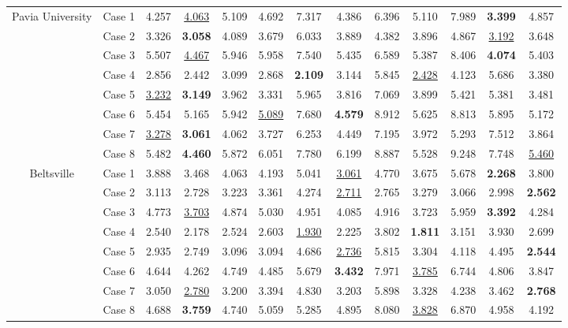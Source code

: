 \begin{table*}[t]
\begin{center}
{\begin{tabular}{cc ccccccccccc}
				\multirow{8}{*}{Pavia University} 
				& Case 1 & 
				4.257 & \underline{4.063} & 5.109 & 4.692 & 7.317 & 4.386 & 6.396 & 5.110 & 7.989 & \textbf{3.399} & 4.857 \\ 
				& Case 2 & 
				3.326 & \textbf{3.058} & 4.089 & 3.679 & 6.033 & 3.889 & 4.382 & 3.896 & 4.867 & \underline{3.192} & 3.648 \\ 
				& Case 3 & 
				5.507 & \underline{4.467} & 5.946 & 5.958 & 7.540 & 5.435 & 6.589 & 5.387 & 8.406 & \textbf{4.074} & 5.403 \\ 
				& Case 4 & 
				2.856 & 2.442 & 3.099 & 2.868 & \textbf{2.109} & 3.144 & 5.845 & \underline{2.428} & 4.123 & 5.686 & 3.380 \\ 
				& Case 5 & 
				\underline{3.232} & \textbf{3.149} & 3.962 & 3.331 & 5.965 & 3.816 & 7.069 & 3.899 & 5.421 & 5.381 & 3.481 \\ 
				& Case 6 & 
				5.454 & 5.165 & 5.942 & \underline{5.089} & 7.680 & \textbf{4.579} & 8.912 & 5.625 & 8.813 & 5.895 & 5.172 \\ 
				& Case 7 & 
				\underline{3.278} & \textbf{3.061} & 4.062 & 3.727 & 6.253 & 4.449 & 7.195 & 3.972 & 5.293 & 7.512 & 3.864 \\ 
				& Case 8 & 
				5.482 & \textbf{4.460} & 5.872 & 6.051 & 7.780 & 6.199 & 8.887 & 5.528 & 9.248 & 7.748 & \underline{5.460} \\ 
				
				\cmidrule(lr){1-13} 
				
				\multirow{8}{*}{Beltsville} 
				& Case 1 & 
				3.888 & 3.468 & 4.063 & 4.193 & 5.041 & \underline{3.061} & 4.770 & 3.675 & 5.678 & \textbf{2.268} & 3.800 \\ 
				& Case 2 & 
				3.113 & 2.728 & 3.223 & 3.361 & 4.274 & \underline{2.711} & 2.765 & 3.279 & 3.066 & 2.998 & \textbf{2.562} \\ 
				& Case 3 & 
				4.773 & \underline{3.703} & 4.874 & 5.030 & 4.951 & 4.085 & 4.916 & 3.723 & 5.959 & \textbf{3.392} & 4.284 \\ 
				& Case 4 & 
				2.540 & 2.178 & 2.524 & 2.603 & \underline{1.930} & 2.225 & 3.802 & \textbf{1.811} & 3.151 & 3.930 & 2.699 \\ 
				& Case 5 & 
				2.935 & 2.749 & 3.096 & 3.094 & 4.686 & \underline{2.736} & 5.815 & 3.304 & 4.118 & 4.495 & \textbf{2.544} \\ 
				& Case 6 & 
				4.644 & 4.262 & 4.749 & 4.485 & 5.679 & \textbf{3.432} & 7.971 & \underline{3.785} & 6.744 & 4.806 & 3.847 \\ 
				& Case 7 & 
				3.050 & \underline{2.780} & 3.200 & 3.394 & 4.830 & 3.203 & 5.898 & 3.328 & 4.238 & 3.462 & \textbf{2.768} \\ 
				& Case 8 & 
				4.688 & \textbf{3.759} & 4.740 & 5.059 & 5.285 & 4.895 & 8.080 & \underline{3.828} & 6.870 & 4.958 & 4.192 \\ 
				
				\bottomrule
			\end{tabular}
		}
	\end{center}
\end{table*}